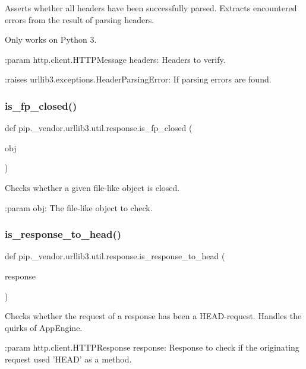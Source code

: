 \begin{DoxyVerb}Asserts whether all headers have been successfully parsed.
Extracts encountered errors from the result of parsing headers.

Only works on Python 3.

:param http.client.HTTPMessage headers: Headers to verify.

:raises urllib3.exceptions.HeaderParsingError:
    If parsing errors are found.
\end{DoxyVerb}
 \mbox{\label{namespacepip_1_1__vendor_1_1urllib3_1_1util_1_1response_a19156ded47f236d89ea54974733eb005}} 
\subsubsection{\texorpdfstring{is\+\_\+fp\+\_\+closed()}{is\_fp\_closed()}}
{\footnotesize\ttfamily def pip.\+\_\+vendor.\+urllib3.\+util.\+response.\+is\+\_\+fp\+\_\+closed (\begin{DoxyParamCaption}\item[{}]{obj }\end{DoxyParamCaption})}

\begin{DoxyVerb}Checks whether a given file-like object is closed.

:param obj:
    The file-like object to check.
\end{DoxyVerb}
 \mbox{\label{namespacepip_1_1__vendor_1_1urllib3_1_1util_1_1response_aca408bfc7dd979b6bc8f433bd104f689}} 
\subsubsection{\texorpdfstring{is\+\_\+response\+\_\+to\+\_\+head()}{is\_response\_to\_head()}}
{\footnotesize\ttfamily def pip.\+\_\+vendor.\+urllib3.\+util.\+response.\+is\+\_\+response\+\_\+to\+\_\+head (\begin{DoxyParamCaption}\item[{}]{response }\end{DoxyParamCaption})}

\begin{DoxyVerb}Checks whether the request of a response has been a HEAD-request.
Handles the quirks of AppEngine.

:param http.client.HTTPResponse response:
    Response to check if the originating request
    used 'HEAD' as a method.
\end{DoxyVerb}
 